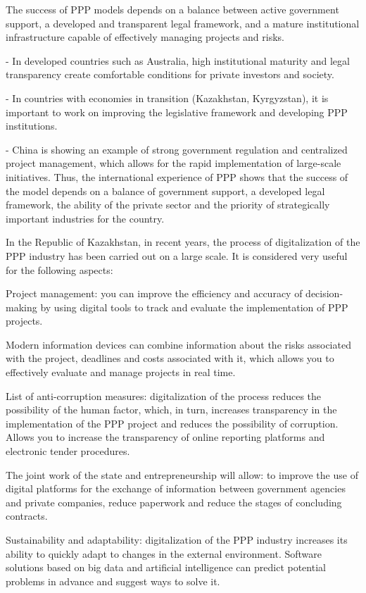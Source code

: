 The success of PPP models depends on a balance between active government
support, a developed and transparent legal framework, and a mature
institutional infrastructure capable of effectively managing projects
and risks.


- In developed countries such as Australia, high institutional maturity
and legal transparency create comfortable conditions for private
investors and society.

- In countries with economies in transition (Kazakhstan, Kyrgyzstan), it
is important to work on improving the legislative framework and
developing PPP institutions.

- China is showing an example of strong government regulation and
centralized project management, which allows for the rapid
implementation of large-scale initiatives.
Thus, the international experience of PPP shows that the success of the
model depends on a balance of government support, a developed legal
framework, the ability of the private sector and the priority of
strategically important industries for the country.

In the Republic of Kazakhstan, in recent years, the process of
digitalization of the PPP industry has been carried out on a large
scale. It is considered very useful for the following aspects:

Project management: you can improve the efficiency and accuracy of
decision-making by using digital tools to track and evaluate the
implementation of PPP projects.

Modern information devices can combine information about the risks
associated with the project, deadlines and costs associated with it,
which allows you to effectively evaluate and manage projects in real
time.

List of anti-corruption measures: digitalization of the process reduces
the possibility of the human factor, which, in turn, increases
transparency in the implementation of the PPP project and reduces the
possibility of corruption. Allows you to increase the transparency of
online reporting platforms and electronic tender procedures.

The joint work of the state and entrepreneurship will allow: to improve
the use of digital platforms for the exchange of information between
government agencies and private companies, reduce paperwork and reduce
the stages of concluding contracts.

Sustainability and adaptability: digitalization of the PPP industry
increases its ability to quickly adapt to changes in the external
environment. Software solutions based on big data and artificial
intelligence can predict potential problems in advance and suggest ways
to solve it.

